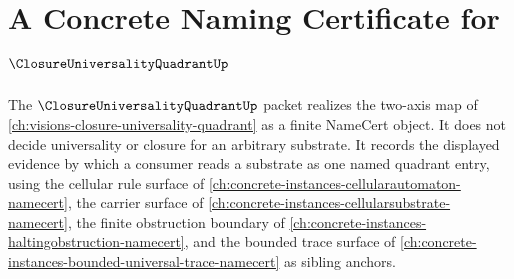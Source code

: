\chapter{A Concrete Naming Certificate for $\ClosureUniversalityQuadrantUp$}
\label{ch:concrete-instances-closureuniversalityquadrant-namecert}

The $\ClosureUniversalityQuadrantUp$ packet realizes the two-axis map of \autoref{ch:visions-closure-universality-quadrant} as a finite NameCert object. It does not decide universality or closure for an arbitrary substrate. It records the displayed evidence by which a consumer reads a substrate as one named quadrant entry, using the cellular rule surface of \autoref{ch:concrete-instances-cellularautomaton-namecert}, the carrier surface of \autoref{ch:concrete-instances-cellularsubstrate-namecert}, the finite obstruction boundary of \autoref{ch:concrete-instances-haltingobstruction-namecert}, and the bounded trace surface of \autoref{ch:concrete-instances-bounded-universal-trace-namecert} as sibling anchors.



